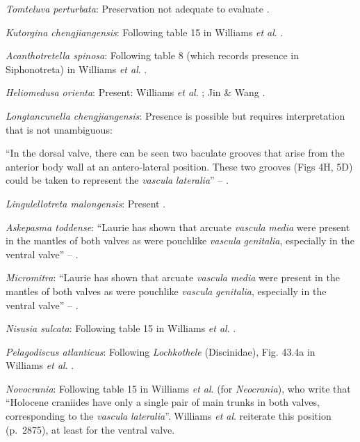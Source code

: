 \documentclass[]{book}
\theoremstyle{definition}
\theoremstyle{definition}
\theoremstyle{definition}
\theoremstyle{remark}
\begin{document}
\emph{Tomteluva perturbata}: Preservation not adequate to evaluate
\citep{Streng2016Anew}.

\emph{Kutorgina chengjiangensis}: Following table 15 in Williams
\emph{et al}. \citeyearpar{Williams2000BrachiopodaLinguliformea}.

\emph{Acanthotretella spinosa}: Following table 8 (which records
presence in Siphonotreta) in Williams \emph{et al}.
\citeyearpar{Williams2000BrachiopodaLinguliformea}.

\emph{Heliomedusa orienta}: Present: Williams \emph{et al}.
\citeyearpar{Williams2000BrachiopodaLinguliformea}; Jin \& Wang
\citeyearpar{Jin1992Revisionof}.

\emph{Longtancunella chengjiangensis}: Presence is possible but requires
interpretation that is not unambiguous:

``In the dorsal valve, there can be seen two baculate grooves that arise
from the\\
anterior body wall at an antero-lateral position. These two grooves
(Figs 4H, 5D) could be taken to represent the \emph{vascula}
\emph{lateralia}'' -- \citet{Zhang2007Agregarious}.

\emph{Lingulellotreta malongensis}: Present
\citep{Williams2000BrachiopodaLinguliformea}.

\emph{Askepasma toddense}: ``Laurie
\citeyearpar{Laurie1987Themusculature} has shown that arcuate
\emph{vascula} \emph{media} were present in the mantles of both valves
as were pouchlike \emph{vascula} \emph{genitalia}, especially in the
ventral valve'' -- \citet{Williams1997BrachiopodaRevised}.

\emph{Micromitra}: ``Laurie \citeyearpar{Laurie1987Themusculature} has
shown that arcuate \emph{vascula} \emph{media} were present in the
mantles of both valves as were pouchlike \emph{vascula}
\emph{genitalia}, especially in the ventral valve'' --
\citet{Williams1997BrachiopodaRevised}.

\emph{Nisusia sulcata}: Following table 15 in Williams \emph{et al}.
\citeyearpar{Williams2000BrachiopodaLinguliformea}.

\emph{Pelagodiscus atlanticus}: Following \emph{Lochkothele}
(Discinidae), Fig. 43.4a in Williams \emph{et al}.
\citeyearpar{Williams2000BrachiopodaLinguliformea}.

\emph{Novocrania}: Following table 15 in Williams \emph{et al}.
\citeyearpar{Williams2000BrachiopodaLinguliformea} (for
\emph{Neocrania}), who write that ``Holocene craniides have only a
single pair of main trunks in both valves, corresponding to the
\emph{vascula} \emph{lateralia}''. Williams \emph{et al}.
\citeyearpar{Williams2007PartH} reiterate this position (p.~2875), at
least for the ventral valve.
\end{document}
